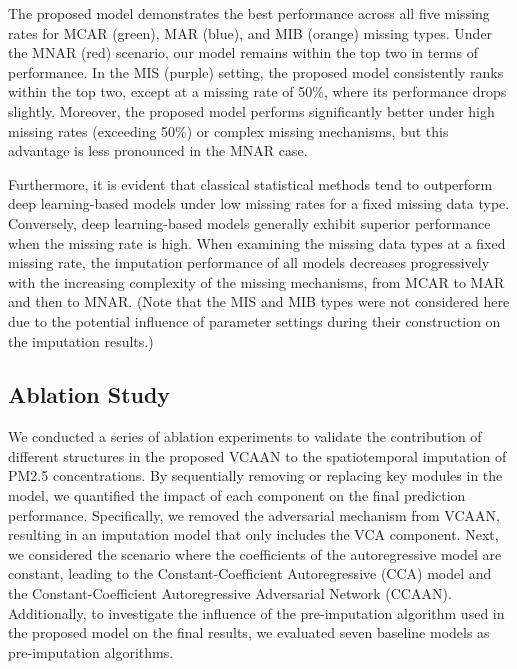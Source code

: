 \documentclass[3p,11pt,authoryear]{elsarticle}
\begin{document}
The proposed model demonstrates the best performance across all five missing rates for MCAR (green), MAR (blue), and MIB (orange) missing types. Under the MNAR (red) scenario, our model remains within the top two in terms of performance. In the MIS (purple) setting, the proposed model consistently ranks within the top two, except at a missing rate of 50\%, where its performance drops slightly. Moreover, the proposed model performs significantly better under high missing rates (exceeding 50\%) or complex missing mechanisms, but this advantage is less pronounced in the MNAR case. 

Furthermore, it is evident that classical statistical methods tend to outperform deep learning-based models under low missing rates for a fixed missing data type. Conversely, deep learning-based models  generally exhibit superior performance when the missing rate is high. 
When examining the missing data types at a fixed missing rate, the imputation performance of all models decreases progressively with the increasing complexity of the missing mechanisms, from MCAR to MAR and then to MNAR. (Note that the MIS and MIB types were not considered here due to the potential influence of parameter settings during their construction on the imputation results.)

\subsection{Ablation Study}\label{subsubsec:Ablation Study}
We conducted a series of ablation experiments to validate the contribution of different structures in the proposed VCAAN to the spatiotemporal imputation of PM2.5 concentrations. By sequentially removing or replacing key modules in the model, we quantified the impact of each component on the final prediction performance. Specifically, we removed the adversarial mechanism from VCAAN, resulting in an imputation model that only includes the VCA component. Next, we considered the scenario where the coefficients of the autoregressive model are constant, leading to the Constant-Coefficient Autoregressive (CCA) model and the Constant-Coefficient Autoregressive Adversarial Network (CCAAN). Additionally, to investigate the influence of the pre-imputation algorithm used in the proposed model on the final results, we evaluated seven baseline models as pre-imputation algorithms. 
\end{document}
